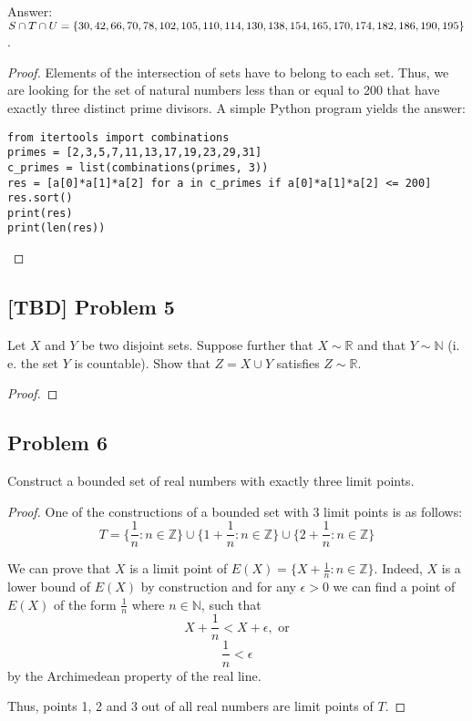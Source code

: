 \documentclass{article}
\begin{document}
Answer: $S \cap T \cap U = \{ 30, 42, 66, 70, 78, 102, 105, 110, 114, 130, 138, 154, \\
165, 170, 174, 182,186, 190, 195 \}$. 

\begin{proof}

Elements of the intersection of sets have to belong to each set. Thus, we are looking for the set of natural numbers less than or equal to 200 that have exactly three distinct prime divisors. A simple Python program yields the answer:

\begin{verbatim}
from itertools import combinations
primes = [2,3,5,7,11,13,17,19,23,29,31]
c_primes = list(combinations(primes, 3))
res = [a[0]*a[1]*a[2] for a in c_primes if a[0]*a[1]*a[2] <= 200]
res.sort()
print(res)
print(len(res))
\end{verbatim}

\end{proof}

\subsection*{[TBD] Problem 5}

\begin{tcolorbox}
Let $X$ and $Y$ be two disjoint sets. Suppose further that $X \sim \mathbb{R}$ and that $Y \sim \mathbb{N}$
(i. e. the set $Y$ is countable). Show that $Z = X \cup Y$ satisfies $Z \sim \mathbb{R}$.
\end{tcolorbox}

\begin{proof}

\end{proof}

\subsection*{Problem 6}

\begin{tcolorbox}
Construct a bounded set of real numbers with exactly three limit points.
\end{tcolorbox}

\begin{proof}
One of the constructions of a bounded set with 3 limit points is as follows:
$$ T = \{ \frac{1}{n} : n \in \mathbb{Z} \} \cup \{ 1+\frac{1}{n} : n \in \mathbb{Z}  \} \cup \{ 2+\frac{1}{n} : n \in \mathbb{Z} \}$$

We can prove that $X$ is a limit point of $E(X) = \{ X + \frac{1}{n} : n \in \mathbb{Z} \}$. Indeed, $X$ is a lower bound of $E(X)$ by construction and for any $\epsilon > 0$ we can find a point of $E(X)$ of the form $\frac{1}{n}$ where $n \in \mathbb{N}$, such that
$$X + \frac{1}{n} < X + \epsilon, \text{ or}$$
$$\frac{1}{n} < \epsilon$$
by the Archimedean property of the real line.

Thus, points 1, 2 and 3 out of all real numbers are limit points of $T$.
\end{proof}
\end{document}
